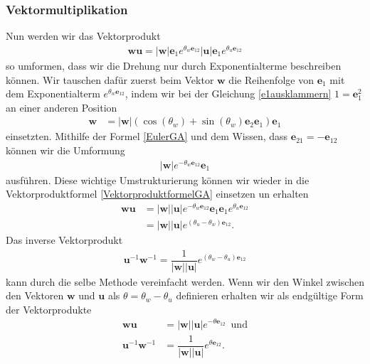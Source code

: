 \subsubsection{Vektormultiplikation}
Nun werden wir das Vektorprodukt
\begin{align} \label{VektorproduktformelGA}
	\mathbf{wu} = |\mathbf{w}|\mathbf{e}_1 e^{\theta_w \mathbf{e}_{12}}|\mathbf{u}|\mathbf{e}_1 e^{\theta_u \mathbf{e}_{12}}
\end{align}
so umformen, dass wir die Drehung nur durch Exponentialterme beschreiben können. Wir tauschen dafür zuerst beim Vektor $\mathbf{w}$ die Reihenfolge von 
$\mathbf{e}_1$ mit dem Exponentialterm $e^{\theta_w \mathbf{e}_{12}}$, indem wir bei der Gleichung \eqref{e1ausklammern} $1=\mathbf{e}_1^2$ an einer anderen Position
\begin{align} 
	\mathbf{w} &= |\mathbf{w}|\left(\cos(\theta_w)+ \sin(\theta_w) \mathbf{e}_2\mathbf{e}_1\right)\mathbf{e}_1
\end{align}
einsetzten. Mithilfe der Formel \eqref{EulerGA} und dem Wissen, dass $\mathbf{e}_{21}= -\mathbf{e}_{12}$ können wir die Umformung
\begin{align}
	|\mathbf{w}|e^{-\theta_w \mathbf{e}_{12}}\mathbf{e}_1
\end{align}
ausführen. Diese wichtige Umstrukturierung können wir wieder in die Vektorproduktformel \eqref{VektorproduktformelGA} einsetzen un erhalten
\begin{align}
	\mathbf{wu} &= |\mathbf{w}||\mathbf{u}|e^{-\theta_w \mathbf{e}_{12}}\mathbf{e}_1\mathbf{e}_1 e^{\theta_u \mathbf{e}_{12}}\\
	&= |\mathbf{w}||\mathbf{u}|e^{(\theta_u-\theta_w) \mathbf{e}_{12}}.
\end{align}
Das inverse Vektorprodukt
\begin{align}
	\mathbf{u}^{-1}\mathbf{w}^{-1} = \dfrac{1}{|\mathbf{w}||\mathbf{u}|}e^{(\theta_w-\theta_u) \mathbf{e}_{12}}
\end{align}
kann durch die selbe Methode vereinfacht werden.
Wenn wir den Winkel zwischen den Vektoren  $\mathbf{w}$ und $\mathbf{u}$ als $\theta = \theta_w - \theta_u$ definieren erhalten wir als endgültige Form der Vektorprodukte
\begin{align}\label{wuExpo}
	\mathbf{wu} &= |\mathbf{w}||\mathbf{u}|e^{-\theta \mathbf{e}_{12}}\enspace\text{und}\\
	\mathbf{u}^{-1}\mathbf{w}^{-1} &= \dfrac{1}{|\mathbf{w}||\mathbf{u}|}e^{\theta \mathbf{e}_{12}} \label{wuExpoInv}.
\end{align}

